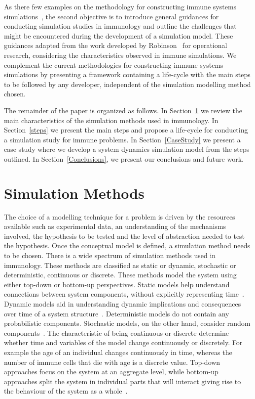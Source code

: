 \documentclass{llncs}
\begin{document}
As there few examples on the methodology for constructing immune systems simulations~\cite{Kitano:2002:Nature,Kitano:2002:Science,CoSMoS-2010-01-Y4}, the second objective is to introduce general guidances for conducting simulation studies in immunology and outline the challenges that might be encountered during the development of a simulation model. These guidances adapted from the work developed by Robinson~\cite{Robinson:2004} for operational research, considering the characteristics observed in immune simulations. We complement the current methodologies for constructing immune systems simulations by presenting a framework containing a life-cycle with the main steps to be followed by any developer, independent of the simulation modelling method chosen.

The remainder of the paper is organized as follows. In Section~\ref{SimulationMethods} we review the main characteristics of the simulation methods used in immunology. In Section~\ref{steps} we present the main steps and propose a life-cycle for conducting a simulation study for immune problems. In Section~\ref{CaseStudy} we present a case study where we develop a system dynamics simulation model from the steps outlined. In Section~\ref{Conclusions}, we present our conclusions and future work.


\section{Simulation Methods}
\label{SimulationMethods}

The choice of a modelling technique for a problem is driven by the resources available such as experimental data, an understanding of the mechanisms involved, the hypothesis to be tested and the level of abstraction needed to test the hypothesis. Once the conceptual model is defined, a simulation method needs to be chosen. There is a wide spectrum of simulation methods used in immunology. These methods are classified as static or dynamic, stochastic or deterministic, continuous or discrete. These methods model the system using either top-down or bottom-up perspectives. Static models help understand connections between system components, without explicitly representing time~\cite{Silva:2010}. Dynamic models aid in understanding dynamic implications and consequences over time of a system structure~\cite{Babulak:2010}. Deterministic models do not contain any probabilistic components. Stochastic models, on the other hand, consider random components~\cite{Banks:2005}. The characteristic of being continuous or discrete determine whether time and variables of the model change continuously or discretely. For example the age of an individual changes continuously in time, whereas the number of immune cells that die with age is a discrete value. Top-down approaches focus on the system at an aggregate level, while bottom-up approaches split the system in individual parts that will interact giving rise to the behaviour of the system as a whole~\cite{Macal:2010}.
\end{document}
